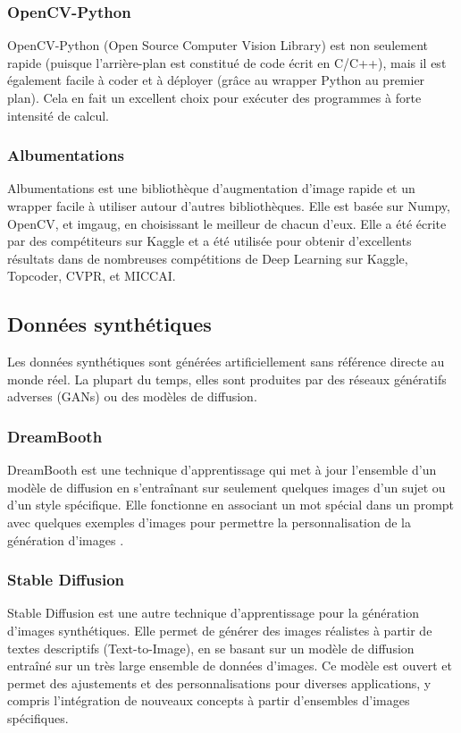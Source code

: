 \subsubsection{OpenCV-Python}
OpenCV-Python (Open Source Computer Vision Library) est non seulement rapide (puisque l'arrière-plan est constitué de code écrit en C/C++), mais il est également facile à coder et à déployer (grâce au wrapper Python au premier plan).
Cela en fait un excellent choix pour exécuter des programmes à forte intensité de calcul.

\subsubsection{Albumentations}
Albumentations est une bibliothèque d'augmentation d'image rapide et un wrapper facile à utiliser autour d'autres bibliothèques. Elle est basée sur Numpy, OpenCV, et imgaug, en choisissant le meilleur de chacun d’eux.
Elle a été écrite par des compétiteurs sur Kaggle et a été utilisée pour obtenir d'excellents résultats dans de nombreuses compétitions de Deep Learning sur Kaggle, Topcoder, CVPR, et MICCAI.

\subsection{Données synthétiques}

Les données synthétiques sont générées artificiellement sans référence directe au monde réel.
La plupart du temps, elles sont produites par des réseaux génératifs adverses (GANs) ou des modèles de diffusion.

\subsubsection{DreamBooth}
DreamBooth est une technique d'apprentissage qui met à jour l'ensemble d’un modèle de diffusion en s'entraînant sur seulement quelques images d'un sujet ou d'un style spécifique.
Elle fonctionne en associant un mot spécial dans un prompt avec quelques exemples d'images pour permettre la personnalisation de la génération d'images \cite{ruiz2023dreambooth}.


\subsubsection{Stable Diffusion}
Stable Diffusion est une autre technique d'apprentissage pour la génération d'images synthétiques.
Elle permet de générer des images réalistes à partir de textes descriptifs (Text-to-Image), en se basant sur un modèle de diffusion entraîné sur un très large ensemble de données d'images.
Ce modèle est ouvert et permet des ajustements et des personnalisations pour diverses applications, y compris l'intégration de nouveaux concepts à partir d'ensembles d'images spécifiques.

